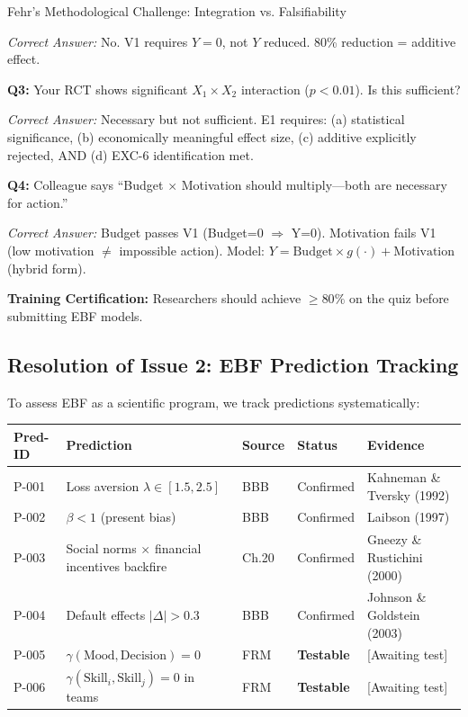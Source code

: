 \begin{chapter}{Fehr's Methodological Challenge: Integration vs. Falsifiability}
\begin{tcolorbox}[colback=blue!5!white,colframe=blue!75!black,title=\textbf{Self-Assessment Quiz}]
\textit{Correct Answer:} No. V1 requires $Y = 0$, not $Y$ reduced. 80\% reduction = additive effect.

\vspace{0.3cm}
\textbf{Q3:} Your RCT shows significant $X_1 \times X_2$ interaction ($p < 0.01$). Is this sufficient?

\textit{Correct Answer:} Necessary but not sufficient. E1 requires: (a) statistical significance, (b) economically meaningful effect size, (c) additive explicitly rejected, AND (d) EXC-6 identification met.

\vspace{0.3cm}
\textbf{Q4:} Colleague says ``Budget $\times$ Motivation should multiply---both are necessary for action.''

\textit{Correct Answer:} Budget passes V1 (Budget=0 $\Rightarrow$ Y=0). Motivation fails V1 (low motivation $\neq$ impossible action). Model: $Y = \text{Budget} \times g(\cdot) + \text{Motivation}$ (hybrid form).
\end{tcolorbox}

\textbf{Training Certification:} Researchers should achieve $\geq 80\%$ on the quiz before submitting EBF models.

\subsection{Resolution of Issue 2: EBF Prediction Tracking}
\label{sec:prediction-tracking}

To assess EBF as a scientific program, we track predictions systematically:

\begin{tcolorbox}[colback=gray!5!white,colframe=gray!75!black,title=\textbf{EBF Prediction Registry Template}]
\begin{tabular}{|p{2cm}|p{3cm}|p{2cm}|p{2cm}|p{2.5cm}|}
\hline
\textbf{Pred-ID} & \textbf{Prediction} & \textbf{Source} & \textbf{Status} & \textbf{Evidence} \\
\hline
P-001 & Loss aversion $\lambda \in [1.5, 2.5]$ & BBB & Confirmed & Kahneman \& Tversky (1992) \\
\hline
P-002 & $\beta < 1$ (present bias) & BBB & Confirmed & Laibson (1997) \\
\hline
P-003 & Social norms $\times$ financial incentives backfire & Ch.20 & Confirmed & Gneezy \& Rustichini (2000) \\
\hline
P-004 & Default effects $|\Delta| > 0.3$ & BBB & Confirmed & Johnson \& Goldstein (2003) \\
\hline
P-005 & $\gamma(\text{Mood}, \text{Decision}) = 0$ & FRM & \textbf{Testable} & [Awaiting test] \\
\hline
P-006 & $\gamma(\text{Skill}_i, \text{Skill}_j) = 0$ in teams & FRM & \textbf{Testable} & [Awaiting test] \\
\hline
\end{tabular}
\end{tcolorbox}


\end{chapter}
